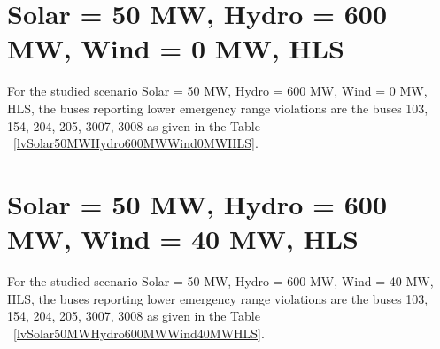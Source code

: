 \documentclass[10pt]{report}
\begin{document}
\section{Solar = 50 MW, Hydro = 600 MW, Wind = 0 MW, HLS}
For the studied scenario Solar = 50 MW, Hydro = 600 MW, Wind = 0 MW, HLS, the buses reporting lower emergency range violations are the buses 103, 154, 204, 205, 3007, 3008 as given in the Table ~\ref{lvSolar50MWHydro600MWWind0MWHLS}.
\begin{table}[H]
\caption{Contingencies reporting bus voltages lower than emergency voltage of 1.1 PU for scenario Solar = 50 MW, Hydro = 600 MW, Wind = 0 MW, HLS}
\label{lvSolar50MWHydro600MWWind0MWHLS}
\centering
{}
\end{table}

\section{Solar = 50 MW, Hydro = 600 MW, Wind = 40 MW, HLS}
For the studied scenario Solar = 50 MW, Hydro = 600 MW, Wind = 40 MW, HLS, the buses reporting lower emergency range violations are the buses 103, 154, 204, 205, 3007, 3008 as given in the Table ~\ref{lvSolar50MWHydro600MWWind40MWHLS}.
\begin{table}[H]
\caption{Contingencies reporting bus voltages lower than emergency voltage of 1.1 PU for scenario Solar = 50 MW, Hydro = 600 MW, Wind = 40 MW, HLS}
\label{lvSolar50MWHydro600MWWind40MWHLS}
\centering
{}
\end{table}
\end{document}
